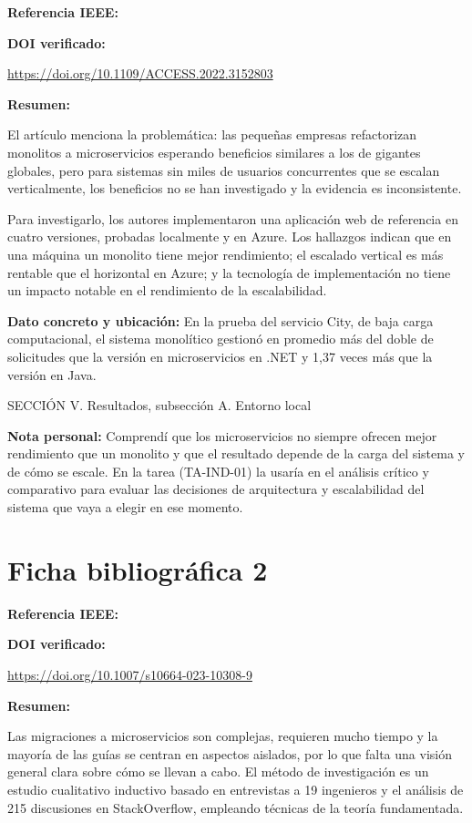 \documentclass[12pt]{article}
\begin{document}
\textbf{Referencia IEEE:}


\textbf{DOI verificado:}

\url{https://doi.org/10.1109/ACCESS.2022.3152803}

\textbf{Resumen:}

El artículo menciona la problemática: las pequeñas empresas refactorizan monolitos a microservicios esperando beneficios similares a los de gigantes globales, pero para sistemas sin miles de usuarios concurrentes que se escalan verticalmente, los beneficios no se han investigado y la evidencia es inconsistente. 

Para investigarlo, los autores implementaron una aplicación web de referencia en cuatro versiones, probadas localmente y en Azure. Los hallazgos indican que en una máquina un monolito tiene mejor rendimiento; el escalado vertical es más rentable que el horizontal en Azure; y la tecnología de implementación no tiene un impacto notable en el rendimiento de la escalabilidad.

\textbf{Dato concreto y ubicación:}
En la prueba del servicio City, de baja carga computacional, el sistema monolítico gestionó en promedio más del doble de solicitudes que la versión en microservicios en .NET y 1,37 veces más que la versión en Java.

SECCIÓN V. Resultados, subsección A. Entorno local

\textbf{Nota personal:}
Comprendí que los microservicios no siempre ofrecen mejor rendimiento que un monolito y que el resultado depende de la carga del sistema y de cómo se escale. En la tarea (TA-IND-01) la usaría en el análisis crítico y comparativo para evaluar las decisiones de arquitectura y escalabilidad del sistema que vaya a elegir en ese momento.

\clearpage
\section*{Ficha bibliográfica 2}

\textbf{Referencia IEEE:}


\textbf{DOI verificado:}

\url{https://doi.org/10.1007/s10664-023-10308-9}

\textbf{Resumen:}

Las migraciones a microservicios son complejas, requieren mucho tiempo y la mayoría de las guías se centran en aspectos aislados, por lo que falta una visión general clara sobre cómo se llevan a cabo. El método de investigación es un estudio cualitativo inductivo basado en entrevistas a 19 ingenieros y el análisis de 215 discusiones en StackOverflow, empleando técnicas de la teoría fundamentada. 
\end{document}
